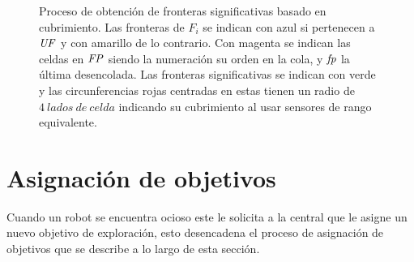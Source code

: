 \begin{figure}[H]
  \centerfloat
  \setcounter{subfigure}{6}

  \caption[Proceso de obtención de fronteras significativas basado en cubrimiento.]{Proceso
    de obtención de fronteras significativas basado en cubrimiento. Las fronteras de
    $F_i$ se indican con azul si pertenecen a $\mathit{UF}$ y con amarillo de lo
    contrario. Con magenta se indican las celdas en $\mathit{FP}$ siendo la
    numeración su orden en la cola, y $\mathit{fp}$ la última desencolada. Las fronteras significativas se indican con
    verde y las circunferencias rojas centradas en estas tienen un radio de $4\
  lados\ de\ celda$ indicando su cubrimiento
    al usar sensores de rango equivalente.}\label{fig:ejemploFSCub}
\end{figure}

\section{Asignación de objetivos}\label{sec:asigTar}

Cuando un robot se encuentra ocioso este le solicita a la central que le asigne
un nuevo objetivo de exploración, esto desencadena el proceso de asignación de
objetivos que se describe a lo largo de esta sección.

